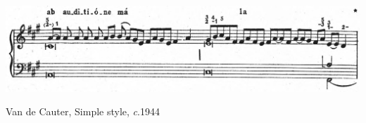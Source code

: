 \vspace*{\fill}

\begin{example}
  \centering
  \includegraphics[width=\linewidth]{c/5/ex/cauter_simple_10.jpg}
  \caption{Van de Cauter, Simple style, \emph{c}.1944}
  \label{mus:cauter_simple_10}
\end{example}

\vspace*{\fill}

